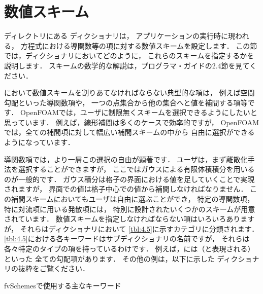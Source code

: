 \section{数値スキーム}
\label{sec:4.4}
ディレクトリにある
%
%
ディクショナリは，
アプリケーションの実行時に現われる，
方程式における導関数等の項に対する数値スキームを設定します．
この節では，ディクショナリにおいてどのように，
これらのスキームを指定するかを説明します．
スキームの数学的な解説は，プログラマ・ガイドの2.4節を見てください．

において数値スキームを割りあてなければならない典型的な項は，
例えば空間勾配といった導関数項や，
一つの点集合から他の集合へと値を補間する項等です．
OpenFOAMでは，ユーザに制限無くスキームを選択できるようにしたいと思っています．
例えば，線形補間は多くのケースで効率的ですが，
OpenFOAMでは，全ての補間項に対して幅広い補間スキームの中から
自由に選択ができるようになっています．

導関数項では，より一層この選択の自由が顕著です．
ユーザは，まず離散化手法を選択することができますが，
ここではガウスによる有限体積積分を用いるのが一般的です．
ガウス積分は格子の界面における値を足していくことで実現されますが，
界面での値は格子中心での値から補間しなければなりません．
この補間スキームにおいてもユーザは自由に選ぶことができ，
特定の導関数項，特に対流項に用いる発散項には，
特別に設計されたいくつかのスキームが用意されています．
数値スキームを指定しなければならない項はいろいろありますが，
それらはディクショナリにおいて
\autoref{tbl:4.5}に示すカテゴリに分類されます．
\autoref{tbl:4.5}における各キーワードはサブディクショナリの名前ですが，
それらは各々特定のタイプの項を持っているわけです．
例えば，には（と表現される）といった
全ての勾配項があります．
その他の例は，以下に示した
%
%
ディクショナリの抜粋をご覧ください．


\begin{table}[ht]
 
 \caption{fvSchemesで使用する主なキーワード}
 \label{tbl:4.5}
\end{table}


